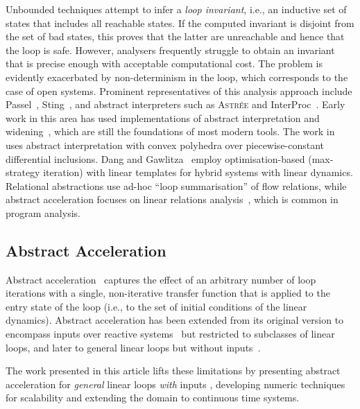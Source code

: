 \documentclass{IEEEtran}
\newcommand{\jrronly}[1]{{}}
\begin{document}
{{\begin{table}[b!]
{\begin{table*}[t]
Unbounded techniques attempt to infer a \emph{loop invariant}, i.e., an
inductive set of states that includes all reachable states.  If the computed
invariant is disjoint from the set of bad states, this proves that the
latter are unreachable and hence that the loop is safe.  However, analysers
frequently struggle to obtain an invariant that is precise enough with
acceptable computational cost.  The problem is evidently exacerbated by 
non-determinism in the loop, which corresponds to the case of
open systems.  Prominent representatives of this analysis approach include
Passel~\cite{johnsonpassel}, Sting~\cite{colon2003linear}, and abstract
interpreters such as \textsc{Astr\'ee} \cite{BCC+03} and
InterProc~\cite{jeannet2010interproc}.
Early work in this area has used implementations of abstract interpretation
and widening~\cite{CC77}, which are still the foundations of most modern tools.
The work in~\cite{HRP94} uses abstract interpretation with convex polyhedra over piecewise-constant
differential inclusions.
Dang and Gawlitza~\cite{DG11a} employ optimi\-sation-based (max-strategy
iteration) with linear templates for hybrid systems with linear dynamics.
Relational abstractions \cite{ST11} use ad-hoc ``loop summarisation''
of flow relations, while abstract acceleration focuses on linear relations
analysis~\cite{GH06,GS14}, which is common in program analysis.  

\subsection{Abstract Acceleration}\label{sec:AA_RW}


Abstract acceleration~\cite{GH06,JSS14,GS14} captures the effect of an arbitrary
number of loop iterations with a single, non-iterative transfer function
that is applied to the entry state of the loop (i.e., to the set of initial
conditions of the linear dynamics).
Abstract acceleration has been extended from its original version to encompass inputs over
reactive systems~\cite{SJ12} but restricted to subclasses of linear
loops, and later to general linear loops but without inputs~\cite{JSS14}. 

The work presented in this article lifts these limitations by presenting 
abstract acceleration for \emph{general} linear loops \emph{with} inputs \cite{cattaruzza2015unbounded},
developing numeric techniques for scalability and extending the domain to continuous time systems.

\jrronly{
The work in \cite{leguernic:hal-01550767} claims the unsoundness of \cite{cattaruzza2015unbounded}. 
The sources of unsoundness referred to in that paper had been address before its publication in
\cite{extended-version} for algorithmic soundness and \cite{cattaruzza2017sound} regarding numerical soundness.
The paper proposes an alternative approach to Abstract Acceleration with inputs which relies on the expansion of
the dynamical equation to a 4x-dimensional model. The model presented there is slower and more imprecise than
the one presented in \cite{cattaruzza2015unbounded}. However, the handling of the guards with respect to calculating
the exact number of iterations would prove to be more precise in most cases. 
}

\end{table*}}
\end{table}}}
\end{document}
